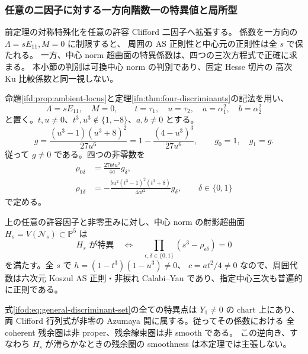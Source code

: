 \subsubsection{任意の二因子に対する一方向階数一の特異値と局所型}
\label{ifod:subsubsec:oneway}

前定理の対称特殊化を任意の許容 Clifford 二因子へ拡張する。
係数を一方向の $\Lambda=sE_{11},M=0$ に制限すると、
周囲の AS 正則性と中心元の正則性は全 $s$ で保たれる。
一方、中心 norm 超曲面の特異係数は、四つの三次方程式で正確に求まる。
本小節の判別は可換中心 norm の判別であり、固定 Hesse 切片の
高次 Ku 比較係数と同一視しない。

命題\ref{ifd:prop:ambient-locus}と定理\ref{ifn:thm:four-discriminants}の記法を用い、
\[
 \Lambda=sE_{11},\quad M=0,\qquad
 t=\tau_1,\quad u=\tau_2,\quad
 a=\alpha_1^2,\quad b=\alpha_2^2
\]
と置く。$t,u\ne0$、$t^3,u^3\notin\{1,-8\}$、$a,b\ne0$ とする。
\begin{equation}\label{ifod:eq:g}
 g=\frac{(u^3-1)(u^3+8)^2}{27u^6}
   =1-\frac{(4-u^3)^3}{27u^6},\qquad
 g_0=1,\quad g_1=g.
\end{equation}
従って $g\ne0$ である。四つの非零数を
\begin{equation}\label{ifod:eq:critical-cubes}
 \begin{aligned}
 \rho_{0\delta}&=\frac{27btu^2}{4a}g_\delta,\\
 \rho_{1\delta}&=-\frac{bu^2(t^3-1)^2(t^3+8)}{4at^2}g_\delta,
       \qquad \delta\in\{0,1\}
 \end{aligned}
\end{equation}
で定める。

\begin{theorem}
\label{ifod:thm:general-values}
上の任意の許容因子と非零重みに対し、中心 norm の射影超曲面
$H_s=V(\mathcal N_s)\subset\mathbb P^5$ は
\begin{equation}\label{ifod:eq:general-discriminant-set}
 H_s\text{ が特異}\quad\Longleftrightarrow\quad
       \prod_{\epsilon,\delta\in\{0,1\}}
          (s^3-\rho_{\epsilon\delta})=0
\end{equation}
を満たす。全 $s$ で $h=(1-t^3)(1-u^3)\ne0$、
$c=at^2/4\ne0$ なので、周囲代数は六次元 Koszul AS 正則・非捩れ
Calabi--Yau であり、指定中心三次も普遍的に正則である。

式\eqref{ifod:eq:general-discriminant-set}の全ての特異点は
$Y_1\ne0$ の chart 上にあり、両 Clifford 行列式が非零の
Azumaya 開に属する。従ってその係数における
全 coherent 残余圏は非 proper、残余線束圏は非 smooth である。
この逆向き、すなわち $H_s$ が滑らかなときの残余圏の
smoothness は本定理では主張しない。
\end{theorem}


